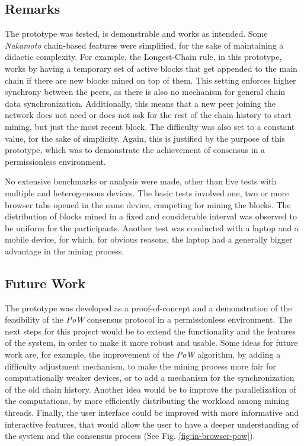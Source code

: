 \documentclass[journal]{IEEEtran}
\begin{document}
\subsection{Remarks}

The prototype was tested, is demonstrable and works as intended. Some \emph{Nakamoto} chain-based
features were simplified, for the sake of maintaining a didactic complexity. For example, 
the Longest-Chain rule, in this prototype, works by having a temporary set of active blocks 
that get appended to the main chain if there are new blocks mined on top
of them. This setting enforces higher synchrony between the peers, as there is also no mechanism for
general chain data synchronization. Additionally, this means that a new peer joining the network does not
need or does not ask for the rest of the chain history to start mining, but just the most recent block.
The difficulty was also set to a constant value, for the sake of simplicity.
Again, this is justified by the purpose of this prototype, which was to demonstrate the achievement
of consensus in a permissionless environment.

No extensive benchmarks or analysis were made, other than live tests with multiple
and heterogeneous devices. The basic tests involved one, two or more browser tabs
opened in the same device, competing for mining the blocks. The distribution of blocks mined
in a fixed and considerable interval was observed to be uniform for the participants. Another test was
conducted with a laptop and a mobile device, for which, for obvious reasons, the laptop
had a generally bigger advantage in the mining process.

\subsection{Future Work}

The prototype was developed as a proof-of-concept and a demonstration of the feasibility
of the \emph{PoW} consensus protocol in a permissionless environment. The next steps
for this project would be to extend the functionality and the features of the system,
in order to make it more robust and usable. Some ideas for future work are, for example,
the improvement of the \emph{PoW} algorithm, by adding a difficulty adjustment mechanism,
to make the mining process more fair for computationally weaker devices, or to
add a mechanism for the synchronization of the old chain history. Another idea would be to
improve the parallelization of the computations, by more efficiently distributing the
workload among mining threads. Finally, the user interface could be improved 
with more informative and interactive features, that would allow the user to have a 
deeper understanding of the system and the consensus process (See Fig. \ref{fig:in-browser-pow}).
\end{document}
